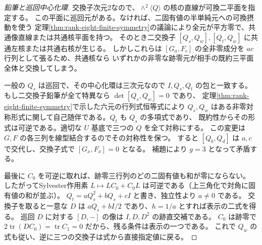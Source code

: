 \begin{proof}[鉛筆と巡回中心化環]
交換子次元2なので、$\wedge^2\langle Q\rangle$ の核の直線が可換二平面を指定する。
この平面に巡回元がある。なければ、二固有値の半単純元への可換摂動を使う
定理\ref{thm:rank-eight-finite-symmetry}の議論により全元が平方零で、共通像直線または共通核平面を持つ。
そのとき二交換子 $[Q_s,Q_w],[Q_t,Q_w]$ に共通左核または共通右核が生じる。
しかしこれらは $[G_a,F_c]$ の全非零成分を $ac$ 行列として張るため、共通核なら
いずれかの非零な跡零元が相手の既約三平面全体と交換してしまう。

一般の $Q_s$ は巡回で、その中心化環は三次元なので $I,Q_s,Q_t$ の包と一致する。
もし二交換子鉛筆が全て特異なら $\det[Q_s,Q_w]=0$ であり、
定理\ref{thm:rank-eight-finite-symmetry}で示した六元の行列式恒等式により
$Q_s,Q_w$ はある非零対称形式に関して自己随伴である。$Q_t$ も $Q_s$ の多項式であり、
既約性からその形式は可逆である。適切な $U$ 基底で三つの $Q$ を全て対称にする。
この変更は $G,F$ の各三列を線型結合するのでその対称性を保つ。
すると $[Q_b,Q_d]$ は $a,c$ で交代し、交換子式で $[G_x,F_x]=0$ となる。
補題により $g=3$ となって矛盾する。

最後に $C_0$ を可逆に取れば、跡零三行列のどの二固有値も和が零にならない。
したがってSylvester作用素 $L\mapsto LC_0+C_0 L$ は可逆である（上三角化で対角に固有値の和が並ぶ）。
$Q_t=a Q_s^2+bQ_s+cI$ と書き、独立性より $a\ne0$ である。
交換子を取ると一意な $D$ は $a Q_s+bI/2$ であり、$h=1/a$ とすれば表示の二式を得る。
巡回 $D$ に対する $[D,-]$ の像は $I,D,D^2$ の跡直交補である。
$C_0$ は跡零で $2\operatorname{tr}(DC_0)=\operatorname{tr}C_1=0$ だから、残る条件は表示の一つである。
これで $Q_w$ の式も従い、逆に三つの交換子は式から直接指定値に戻る。
\end{proof}
